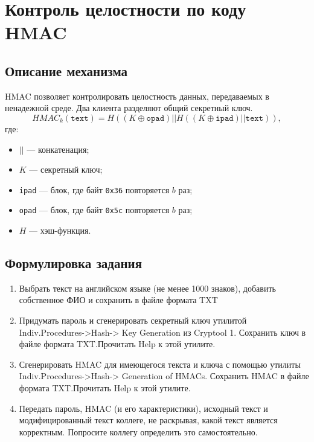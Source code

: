 \documentclass[a4paper, 14pt]{extarticle}
\begin{document}
\section{Контроль целостности по коду HMAC}
\subsection{Описание механизма}
HMAC позволяет контролировать целостность данных, передаваемых в ненадежной среде. Два клиента разделяют общий секретный ключ.
\begin{equation}
    HMAC_k(\mathtt{text}) = H((K \oplus \mathtt{opad}) || H ((K \oplus \mathtt{ipad}) || \mathtt{text}) ),
\end{equation}
где:
\begin{itemize}
    \item $||$ --- конкатенация;
    \item $K$ --- секретный ключ;
    \item \texttt{ipad} --- блок, где байт \texttt{0x36} повторяется $b$ раз;
    \item \texttt{opad} --- блок, где байт \texttt{0x5c} повторяется $b$ раз;
    \item $H$ --- хэш-функция.
\end{itemize}

\subsection{Формулировка задания}
\begin{enumerate}
    \item  Выбрать текст на английском языке (не менее 1000 знаков), добавить собственное ФИО и сохранить в файле формата TXT
    \item  Придумать пароль и сгенерировать секретный ключ утилитой Indiv.Procedures->Hash-> Key Generation из Cryptool 1. Сохранить ключ в файле формата TXT.\@ Прочитать Help к этой утилите.
    \item  Сгенерировать HMAC для имеющегося текста и ключа с помощью утилиты Indiv.Procedures->Hash-> Generation of HMACs. Сохранить HMAC в файле формата TXT.\@ Прочитать Help к этой утилите.
    \item  Передать пароль, HMAC (и его характеристики), исходный текст и модифицированный текст коллеге, не раскрывая, какой текст является корректным. Попросите коллегу определить это самостоятельно.
\end{enumerate}
\end{document}
